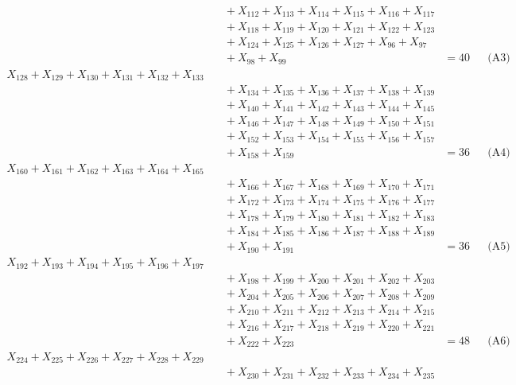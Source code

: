\documentclass[a4paper,10pt]{article}
\begin{document}
{\begin{align}
&\quad  + X_{112} + X_{113} + X_{114} + X_{115} + X_{116} + X_{117} \\[0.5ex]
&\quad  + X_{118} + X_{119} + X_{120} + X_{121} + X_{122} + X_{123} \\[0.5ex]
&\quad  + X_{124} + X_{125} + X_{126} + X_{127} + X_{96} + X_{97} \\[0.5ex]
&\quad  + X_{98} + X_{99} &= 40 && \text{(A3)} \\
X_{128} + X_{129} + X_{130} + X_{131} + X_{132} + X_{133} \\[0.5ex]
&\quad  + X_{134} + X_{135} + X_{136} + X_{137} + X_{138} + X_{139} \\[0.5ex]
&\quad  + X_{140} + X_{141} + X_{142} + X_{143} + X_{144} + X_{145} \\[0.5ex]
&\quad  + X_{146} + X_{147} + X_{148} + X_{149} + X_{150} + X_{151} \\[0.5ex]
&\quad  + X_{152} + X_{153} + X_{154} + X_{155} + X_{156} + X_{157} \\[0.5ex]
&\quad  + X_{158} + X_{159} &= 36 && \text{(A4)} \\
X_{160} + X_{161} + X_{162} + X_{163} + X_{164} + X_{165} \\[0.5ex]
&\quad  + X_{166} + X_{167} + X_{168} + X_{169} + X_{170} + X_{171} \\[0.5ex]
&\quad  + X_{172} + X_{173} + X_{174} + X_{175} + X_{176} + X_{177} \\[0.5ex]
&\quad  + X_{178} + X_{179} + X_{180} + X_{181} + X_{182} + X_{183} \\[0.5ex]
&\quad  + X_{184} + X_{185} + X_{186} + X_{187} + X_{188} + X_{189} \\[0.5ex]
&\quad  + X_{190} + X_{191} &= 36 && \text{(A5)} \\
X_{192} + X_{193} + X_{194} + X_{195} + X_{196} + X_{197} \\[0.5ex]
&\quad  + X_{198} + X_{199} + X_{200} + X_{201} + X_{202} + X_{203} \\[0.5ex]
&\quad  + X_{204} + X_{205} + X_{206} + X_{207} + X_{208} + X_{209} \\[0.5ex]
&\quad  + X_{210} + X_{211} + X_{212} + X_{213} + X_{214} + X_{215} \\[0.5ex]
&\quad  + X_{216} + X_{217} + X_{218} + X_{219} + X_{220} + X_{221} \\[0.5ex]
&\quad  + X_{222} + X_{223} &= 48 && \text{(A6)} \\
X_{224} + X_{225} + X_{226} + X_{227} + X_{228} + X_{229} \\[0.5ex]
&\quad  + X_{230} + X_{231} + X_{232} + X_{233} + X_{234} + X_{235} \\[0.5ex]

\end{align}}
\end{document}
